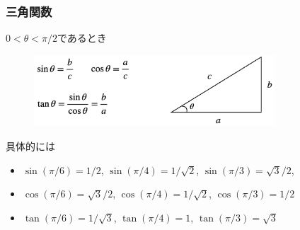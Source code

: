 \begin{frame}
\frametitle{三角関数}

$0 <\theta <\pi/2$であるとき

\begin{figure}[htbp]
 \begin{center} 
  \includegraphics[width=90mm]{calculus2/sin_cos_tan.png}
 \end{center}
\end{figure}

具体的には
\begin{itemize}
\item $\sin(\pi/6)=1/2$, $\sin(\pi/4)=1/\sqrt{2}$, $\sin(\pi/3) =\sqrt{3}/2$, 
\item $\cos(\pi/6)=\sqrt{3}/2$, $\cos(\pi/4)=1/\sqrt{2}$, $\cos(\pi/3)=1/2$
\item  $\tan(\pi/6)=1/\sqrt{3}$, $\tan(\pi/4)=1$, $\tan(\pi/3)=\sqrt{3}$
\end{itemize}


\end{frame}







